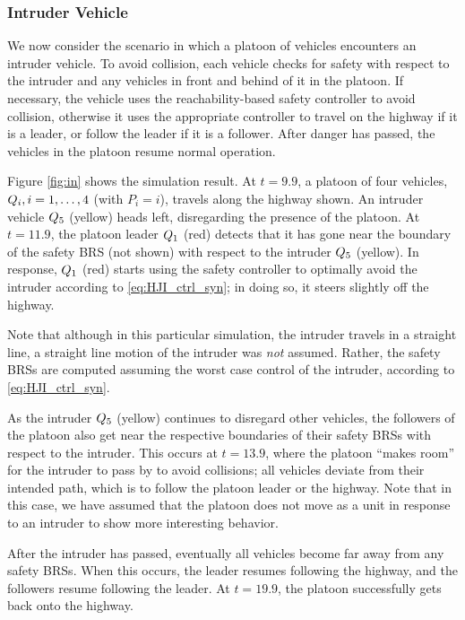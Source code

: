 \subsubsection{Intruder Vehicle}
We now consider the scenario in which a platoon of vehicles encounters an intruder vehicle. To avoid collision, each vehicle checks for safety with respect to the intruder and any vehicles in front and behind of it in the platoon. If necessary, the vehicle uses the reachability-based safety controller to avoid collision, otherwise it uses the appropriate controller to travel on the highway if it is a leader, or follow the leader if it is a follower. After danger has passed, the vehicles in the platoon resume normal operation.

Figure \ref{fig:in} shows the simulation result. At $t=9.9$, a platoon of four vehicles, $Q_{i},i=1,\ldots,4$ (with $P_i = i$), travels along the highway shown. An intruder vehicle $Q_{5}$ (yellow) heads left, disregarding the presence of the platoon. At $t=11.9$, the platoon leader $Q_{1}$ (red) detects that it has gone near the boundary of the safety BRS (not shown) with respect to the intruder $Q_{5}$ (yellow). In response, $Q_{1}$ (red) starts using the safety controller to optimally avoid the intruder according to \eqref{eq:HJI_ctrl_syn}; in doing so, it steers slightly off the highway. 

Note that although in this particular simulation, the intruder travels in a straight line, a straight line motion of the intruder was \textit{not} assumed. Rather, the safety BRSs are computed assuming the worst case control of the intruder, according to \eqref{eq:HJI_ctrl_syn}.

As the intruder $Q_{5}$ (yellow) continues to disregard other vehicles, the followers of the platoon also get near the respective boundaries of their safety BRSs with respect to the intruder. This occurs at $t=13.9$, where the platoon ``makes room'' for the intruder to pass by to avoid collisions; all vehicles deviate from their intended path, which is to follow the platoon leader or the highway. Note that in this case, we have assumed that the platoon does not move as a unit in response to an intruder to show more interesting behavior.

After the intruder has passed, eventually all vehicles become far away from any safety BRSs. When this occurs, the leader resumes following the highway, and the followers resume following the leader. At $t=19.9$, the platoon successfully gets back onto the highway.

